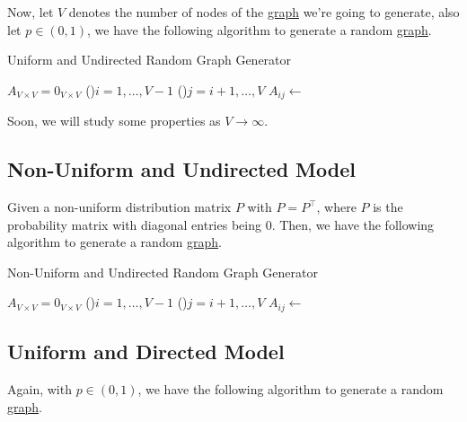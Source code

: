 Now, let \(V\) denotes the number of nodes of the \hyperref[def:graph]{graph} we're going to generate, also let \(p\in(0, 1)\), we have the following algorithm to generate a random \hyperref[def:graph]{graph}.

\begin{algorithm}[H]\label{algo:uniform-and-undirected-model-algo}
	\DontPrintSemicolon{}
	\caption{Uniform and Undirected Random Graph Generator}
	\BlankLine

	\(A_{V\times V} = 0_{V \times V}\) 
	\;
	\For(){\(i= 1, \dots  , V-1\)}{
		\For(){\(j=i+1, \dots  , V\)}{
			\(A_{ij} \gets \)
		}
	}
	\;
\end{algorithm}

Soon, we will study some properties as \(V\to \infty\).

\subsection{Non-Uniform and Undirected Model}\label{subsec:non-uniform-and-undirected-model}
Given a non-uniform distribution matrix \(P\) with \(P = P^{\top}\), where \(P\) is the probability matrix with diagonal entries being \(0\). Then, we have the following algorithm to generate a random \hyperref[def:graph]{graph}.

\begin{algorithm}[H]\label{algo:non-uniform-and-undirected-model-algo}
	\DontPrintSemicolon{}
	\caption{Non-Uniform and Undirected Random Graph Generator}
	\BlankLine

	\(A_{V\times V} = 0_{V \times V}\) 
	\;
	\For(){\(i= 1, \dots  , V-1\)}{
	\For(){\(j=i+1, \dots  , V\)}{
	\(A_{ij} \gets \)
	}
	}
	\;
\end{algorithm}

\subsection{Uniform and Directed Model}\label{subsec:uniform-and-directed-model}
Again, with \(p\in(0, 1)\), we have the following algorithm to generate a random \hyperref[def:graph]{graph}.

